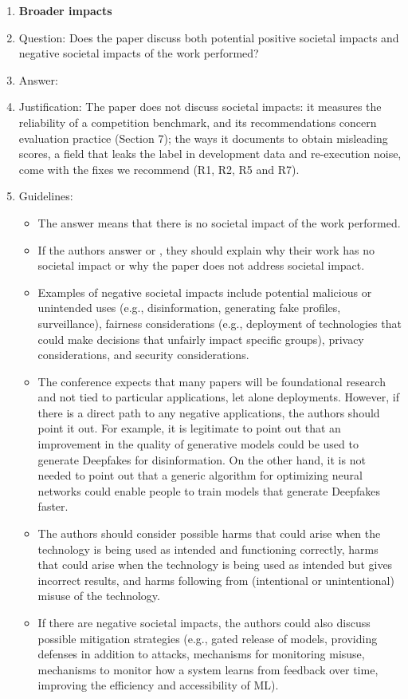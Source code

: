 \begin{enumerate}
\item {\bf Broader impacts}
    \item[] Question: Does the paper discuss both potential positive societal impacts and negative societal impacts of the work performed?
    \item[] Answer: \answerNo{}
    \item[] Justification: The paper does not discuss societal impacts: it measures the reliability of a competition benchmark, and its recommendations concern evaluation practice (Section 7); the ways it documents to obtain misleading scores, a field that leaks the label in development data and re-execution noise, come with the fixes we recommend (R1, R2, R5 and R7).
    \item[] Guidelines:
    \begin{itemize}
        \item The answer \answerNA{} means that there is no societal impact of the work performed.
        \item If the authors answer \answerNA{} or \answerNo, they should explain why their work has no societal impact or why the paper does not address societal impact.
        \item Examples of negative societal impacts include potential malicious or unintended uses (e.g., disinformation, generating fake profiles, surveillance), fairness considerations (e.g., deployment of technologies that could make decisions that unfairly impact specific groups), privacy considerations, and security considerations.
        \item The conference expects that many papers will be foundational research and not tied to particular applications, let alone deployments. However, if there is a direct path to any negative applications, the authors should point it out. For example, it is legitimate to point out that an improvement in the quality of generative models could be used to generate Deepfakes for disinformation. On the other hand, it is not needed to point out that a generic algorithm for optimizing neural networks could enable people to train models that generate Deepfakes faster.
        \item The authors should consider possible harms that could arise when the technology is being used as intended and functioning correctly, harms that could arise when the technology is being used as intended but gives incorrect results, and harms following from (intentional or unintentional) misuse of the technology.
        \item If there are negative societal impacts, the authors could also discuss possible mitigation strategies (e.g., gated release of models, providing defenses in addition to attacks, mechanisms for monitoring misuse, mechanisms to monitor how a system learns from feedback over time, improving the efficiency and accessibility of ML).
    \end{itemize}
    

\end{enumerate}
